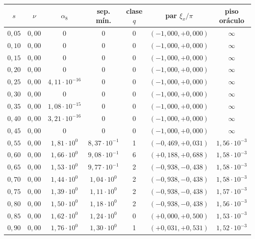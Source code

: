 \begin{tabular}{ccccccc}
\toprule
$s$ & $\nu$ & $\alpha_8$ & sep. mín. & clase $q$ & par $\xi_x/\pi$ & piso oráculo \\
\midrule
$0{,}05$ & $0{,}00$ & $0$ & $0$ & 0 & $(-1{,}000, +0{,}000)$ & $\infty$ \\
$0{,}10$ & $0{,}00$ & $0$ & $0$ & 0 & $(-1{,}000, +0{,}000)$ & $\infty$ \\
$0{,}15$ & $0{,}00$ & $0$ & $0$ & 0 & $(-1{,}000, +0{,}000)$ & $\infty$ \\
$0{,}20$ & $0{,}00$ & $0$ & $0$ & 0 & $(-1{,}000, +0{,}000)$ & $\infty$ \\
$0{,}25$ & $0{,}00$ & $4{,}11 \cdot 10^{-16}$ & $0$ & 0 & $(-1{,}000, +0{,}000)$ & $\infty$ \\
$0{,}30$ & $0{,}00$ & $0$ & $0$ & 0 & $(-1{,}000, +0{,}000)$ & $\infty$ \\
$0{,}35$ & $0{,}00$ & $1{,}08 \cdot 10^{-15}$ & $0$ & 0 & $(-1{,}000, +0{,}000)$ & $\infty$ \\
$0{,}40$ & $0{,}00$ & $3{,}21 \cdot 10^{-16}$ & $0$ & 0 & $(-1{,}000, +0{,}000)$ & $\infty$ \\
$0{,}45$ & $0{,}00$ & $0$ & $0$ & 0 & $(-1{,}000, +0{,}000)$ & $\infty$ \\
$0{,}55$ & $0{,}00$ & $1{,}81 \cdot 10^{0}$ & $8{,}37 \cdot 10^{-1}$ & 1 & $(-0{,}469, +0{,}031)$ & $1{,}56 \cdot 10^{-3}$ \\
$0{,}60$ & $0{,}00$ & $1{,}66 \cdot 10^{0}$ & $9{,}08 \cdot 10^{-1}$ & 6 & $(+0{,}188, +0{,}688)$ & $1{,}58 \cdot 10^{-3}$ \\
$0{,}65$ & $0{,}00$ & $1{,}53 \cdot 10^{0}$ & $9{,}77 \cdot 10^{-1}$ & 2 & $(-0{,}938, -0{,}438)$ & $1{,}58 \cdot 10^{-3}$ \\
$0{,}70$ & $0{,}00$ & $1{,}44 \cdot 10^{0}$ & $1{,}04 \cdot 10^{0}$ & 2 & $(-0{,}938, -0{,}438)$ & $1{,}58 \cdot 10^{-3}$ \\
$0{,}75$ & $0{,}00$ & $1{,}39 \cdot 10^{0}$ & $1{,}11 \cdot 10^{0}$ & 2 & $(-0{,}938, -0{,}438)$ & $1{,}57 \cdot 10^{-3}$ \\
$0{,}80$ & $0{,}00$ & $1{,}50 \cdot 10^{0}$ & $1{,}18 \cdot 10^{0}$ & 2 & $(-0{,}938, -0{,}438)$ & $1{,}56 \cdot 10^{-3}$ \\
$0{,}85$ & $0{,}00$ & $1{,}62 \cdot 10^{0}$ & $1{,}24 \cdot 10^{0}$ & 0 & $(+0{,}000, +0{,}500)$ & $1{,}53 \cdot 10^{-3}$ \\
$0{,}90$ & $0{,}00$ & $1{,}76 \cdot 10^{0}$ & $1{,}30 \cdot 10^{0}$ & 1 & $(+0{,}031, +0{,}531)$ & $1{,}52 \cdot 10^{-3}$ \\

\end{tabular}
